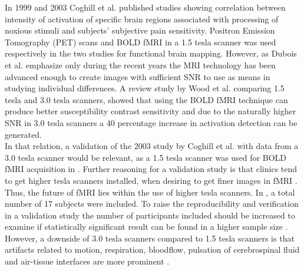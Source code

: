 In 1999 and 2003 Coghill et al. \cite{Coghill1999, Coghill2003} published studies showing correlation between intensity of activation of specific brain regions associated with processing of noxious stimuli and subjects’ subjective pain sensitivity. Positron Emission Tomography (PET) scans and BOLD fMRI in a 1.5 tesla scanner was used respectively in the two studies for functional brain mapping. 
However, as Dubois et al. \cite{Dubois2016} emphasize only during the recent years the MRI technology has been advanced enough to create images with sufficient SNR to use as means in studying individual differences. A review study by Wood et al. \cite{Wood2012} comparing 1.5 tesla and 3.0 tesla scanners, showed that using the BOLD fMRI technique can produce better susceptibility contrast sensitivity and due to the naturally higher SNR in 3.0 tesla scanners a 40 percentage increase in activation detection can be generated. \\
In that relation, a validation of the 2003 study by Coghill et al. \cite{Coghill2003} with data from a 3.0 tesla scanner would be relevant, as a 1.5 tesla scanner was used for BOLD fMRI acquisition in \cite{Coghill2003}. Further reasoning for a validation study is that clinics tend to get higher tesla scanners installed, when desiring to get finer images in fMRI \cite{Wood2012}. Thus, the future of fMRI lies within the use of higher tesla scanners. In \cite{Coghill2003}, a total number of 17 subjects were included. To raise the reproducibility and verification in a validation study the number of participants included should be increased to examine if statistically significant result can be found in a higher sample size \cite{Dubois2016, Button2013}. \\
However, a downside of 3.0 tesla scanners compared to 1.5 tesla scanners is that artifacts related to motion, respiration, bloodflow, pulsation of cerebrospinal fluid and air-tissue interfaces are more prominent \cite{Wood2012}. 

